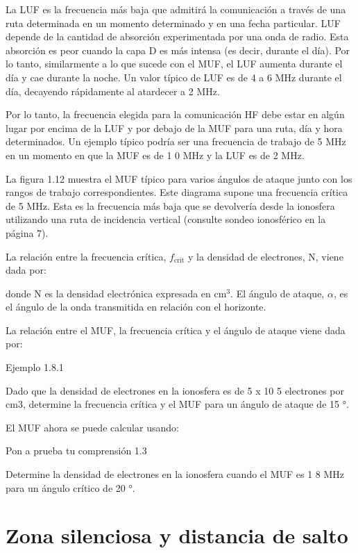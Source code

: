 La \ac{LUF} es la frecuencia más baja que admitirá la comunicación a través de una ruta determinada en un momento determinado y en una fecha particular. \ac{LUF} depende de la cantidad de absorción experimentada por una onda de radio. Esta absorción es peor cuando la capa D es más intensa (es decir, durante el día). Por lo tanto, similarmente a lo que sucede con el \ac{MUF}, el \ac{LUF} aumenta durante el día y cae durante la noche. Un valor típico de \ac{LUF} es de 4 a 6 MHz durante el día, decayendo rápidamente al atardecer a 2 MHz.

Por lo tanto, la frecuencia elegida para la comunicación HF debe estar en algún lugar por encima de la \ac{LUF} y por debajo de la \ac{MUF} para una ruta, día y hora determinados. Un ejemplo típico podría ser una frecuencia de trabajo de 5 MHz en un momento en que la \ac{MUF} es de 1 0 MHz y la \ac{LUF} es de 2 MHz.

La figura 1.12 muestra el \ac{MUF} típico para varios ángulos de ataque junto con los rangos de trabajo correspondientes. Este diagrama supone una frecuencia crítica de 5 MHz. Esta es la frecuencia más baja que se devolvería desde la ionosfera utilizando una ruta de incidencia vertical (consulte sondeo ionosférico en la página 7).

La relación entre la frecuencia crítica, $f_{\text{crit}}$ y la densidad de electrones, N, viene dada por:


donde N es la densidad electrónica expresada en cm$^3$. El ángulo de ataque, $\alpha$, es el ángulo de la onda transmitida en relación con el horizonte.

La relación entre el \ac{MUF}, la frecuencia crítica y el ángulo de ataque viene dada por:

Ejemplo 1.8.1

Dado que la densidad de electrones en la ionosfera es de 5 x 10 5 electrones por cm3, determine la frecuencia crítica y el \ac{MUF} para un ángulo de ataque de 15 °.


El \ac{MUF} ahora se puede calcular usando:

Pon a prueba tu comprensión 1.3

Determine la densidad de electrones en la ionosfera cuando el \ac{MUF} es 1 8 MHz para un ángulo crítico de 20 °.

\section{Zona silenciosa y distancia de salto}
\label{sec:A.10.zona.silenciosa}

